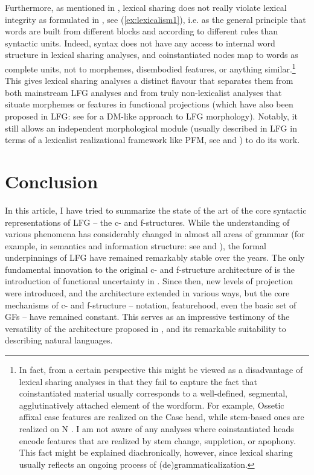 \documentclass[output=paper,hidelinks]{langscibook}
\begin{document}
 Furthermore, as mentioned in , lexical sharing does not really violate lexical integrity as formulated in \textcite{bresnan1995the-lexical}, see (\ref{ex:lexicalism1}), i.e. as the general principle that words are built from different blocks and according to different rules than syntactic units. Indeed, syntax does not have any access to internal word structure in lexical sharing analyses, and coinstantiated nodes map to words as complete units, not to morphemes, disembodied features, or anything similar.\footnote{In fact, from a certain perspective this might be viewed as a disadvantage of lexical sharing analyses in that they fail to capture the fact that coinstantiated material usually corresponds to a well-defined, segmental, agglutinatively attached element of the wordform. For example, Ossetic affixal case features are realized on the Case head, while stem-based ones are realized on N \parencite{belyaev2014-case-EN,Belyaev2021}. I am not aware of any analyses where coinstantiated heads encode features that are realized by stem change, suppletion, or apophony. This fact might be explained diachronically, however, since lexical sharing usually reflects an ongoing process of (de)grammaticalization.} This gives lexical sharing analyses a distinct flavour that separates them from both mainstream LFG analyses and from truly non-lexicalist analyses that situate morphemes or features in functional projections (which have also been proposed in LFG: see \citealt{Melchin2020} for a DM-like approach to LFG morphology).  Notably, it still allows an independent morphological module (usually described in LFG in terms of a lexicalist realizational framework like PFM, see \citet{Belyaev2021} and ) to do its work.
 

 \section{Conclusion}
 
In this article, I have tried to summarize the state of the art of the core syntactic representations of LFG -- the c- and f-structures. While the understanding of various phenomena has considerably changed in almost all areas of grammar (for example, in semantics and information structure: see  and ), the formal underpinnings of LFG have remained remarkably stable over the years. The only fundamental innovation to the original c- and f-structure architecture of \textcite{kaplanbresnan82} is the introduction of functional uncertainty in \textcite{kaplzaen89}. Since then, new levels of projection were introduced, and the architecture extended in various ways, but the core mechanisms of c- and f-structure -- notation, featurehood, even the basic set of GFs -- have remained constant. This serves as an impressive testimony of the versatility of the architecture proposed in \textcite{kaplanbresnan82}, and its remarkable suitability to describing natural languages.
 
\end{document}
